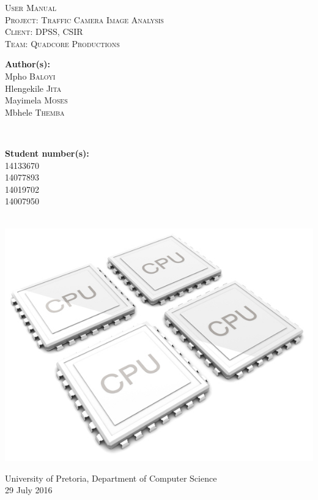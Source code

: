 \documentclass[a4paper,12pt]{article}
\begin{document}
\begin{titlepage}
\center

\textsc{\LARGE User Manual}\\[1.5cm]
\textsc{\Large Project: Traffic Camera Image Analysis}\\[1.5cm]
\textsc{\large Client: DPSS, CSIR}\\[0.5cm]
\textsc{\large Team: Quadcore Productions}\\[0.5cm]

\begin{minipage}{0.4\textwidth}
\begin{flushleft} \large
\textbf{Author(s):}\\
Mpho \textsc{Baloyi}\\
Hlengekile \textsc{Jita}\\
Mayimela \textsc{Moses}\\
Mbhele \textsc{Themba}\\
\end{flushleft}
\end{minipage}
~
\begin{minipage}{0.4\textwidth}
\begin{flushright} \large
\textbf{Student number(s):} \\
14133670\\ %
14077893\\
14019702\\
14007950\\
\end{flushright}
\end{minipage}\\

\includegraphics[width=\textwidth]{2012-quad-core-phones.jpg}

{\large University of Pretoria, Department of Computer Science}\\

{\large 29 July 2016}\\[3cm]

\vfil

\end{titlepage}
\end{document}

